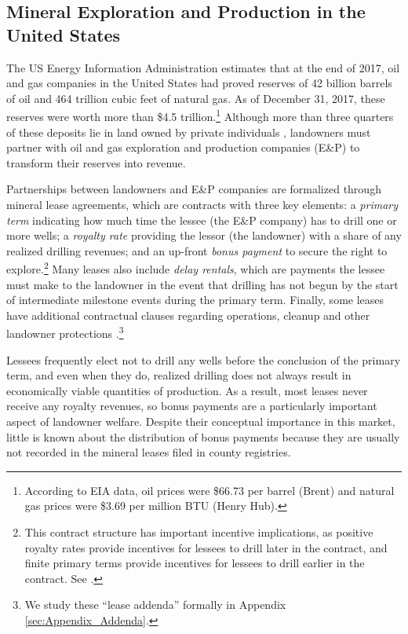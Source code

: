 \documentclass[12pt]{article}
\begin{document}
\subsection{Mineral Exploration and Production in the United States \label{sec:MineralBackground}}
The US Energy Information Administration estimates that at the end of 2017, oil and gas companies in the United States had proved reserves of 42 billion barrels of oil and 464 trillion cubic feet of natural gas. As of December 31, 2017, these reserves were worth more than \$4.5 trillion.\footnote{According to EIA data, oil prices were \$66.73 per barrel (Brent) and natural gas prices were \$3.69 per million BTU (Henry Hub).} Although more than three quarters of these deposits lie in land owned by private individuals \citep{fitzgerald_us_2016}, landowners must partner with oil and gas exploration and production companies (E\&P) to transform their reserves into revenue. 

Partnerships between landowners and E\&P companies are formalized through mineral lease agreements, which are contracts with three key elements: a \textit{primary term} indicating how much time the lessee (the E\&P company) has to drill one or more wells; a \textit{royalty rate} providing the lessor (the landowner) with a share of any realized drilling revenues; and an up-front \textit{bonus payment} to secure the right to explore.\footnote{This contract structure has important incentive implications, as positive royalty rates provide incentives for lessees to drill later in the contract, and finite primary terms provide incentives for lessees to drill earlier in the contract.  See \citet{herrnstadt}.} Many leases also include \textit{delay rentals}, which are payments the lessee must make to the landowner in the event that drilling has not begun by the start of intermediate milestone events during the primary term. Finally, some leases have additional contractual clauses regarding operations, cleanup and other landowner protections \citep{vissing_one--many_2017}.\footnote{We study these ``lease addenda'' formally in Appendix \ref{sec:Appendix_Addenda}.} 

Lessees frequently elect not to drill any wells before the conclusion of the primary term, and even when they do, realized drilling does not always result in economically viable quantities of production. As a result, most leases never receive any royalty revenues, so bonus payments are a particularly important aspect of landowner welfare. Despite their conceptual importance in this market, little is known about the distribution of bonus payments because they are usually not recorded in the mineral leases filed in county registries. 
\end{document}
